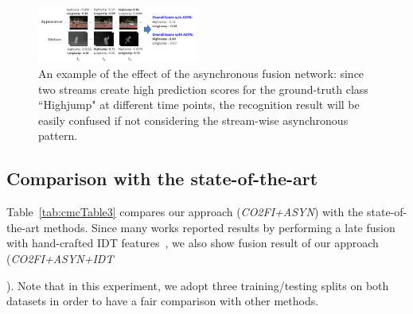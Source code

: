 \documentclass[letterpaper]{article} %
\begin{document}
{\begin{figure}
  \centering
  \includegraphics[width=0.47\textwidth,height=0.18\textwidth]{./figures1/exp.png}
  \caption{An example of the effect of the asynchronous fusion network: since two streams create high prediction scores for the ground-truth class ``Highjump" at different time points, the recognition result will be easily confused if not considering the stream-wise asynchronous pattern.} %
    \label{fig:exp}
\end{figure}




\subsection{Comparison with the state-of-the-art}

Table~\ref{tab:cmcTable3} compares our approach (\emph{CO2FI+ASYN}) with the state-of-the-art methods. Since many works reported results by performing a late fusion with hand-crafted IDT features~\cite{iDT}, we also show fusion result of our approach (\emph{CO2FI+ASYN+IDT}}). Note that in this experiment, we adopt three training/testing splits on both datasets in order to have a fair comparison with other methods.


\end{document}
